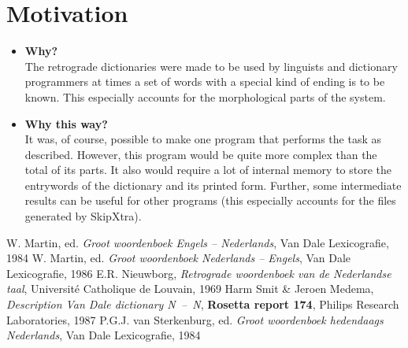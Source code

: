 \section{Motivation}
\begin{itemize}
  \item {\bf Why?}\\
        The retrograde dictionaries were made to be used by linguists and 
        dictionary programmers at times a set of words with a special kind of 
        ending is to be known. This especially accounts for the morphological 
        parts of the system.
  \item {\bf Why this way?}\\
        It was, of course, possible to make one program that performs the task
        as described. However, this program would be quite more complex than 
        the total of its parts. It also would require a lot of internal memory
        to store the entrywords of the dictionary and its printed form. Further,
        some intermediate results can be useful for other programs (this 
        especially accounts for the files generated by SkipXtra).
\end{itemize}

\begin{thebibliography}{MMM99m}
  W. Martin, ed. {\em Groot woordenboek 
  Engels -- Nederlands}, Van Dale Lexicografie, 1984
  W. Martin, ed. {\em Groot woordenboek 
  Nederlands -- Engels}, Van Dale Lexicografie, 1986
  E.R. Nieuwborg, {\em Retrograde woordenboek van de 
  Nederlandse taal}, Universit\'{e} Catholique de Louvain, 1969
  Harm Smit \& Jeroen Medema, {\em Description Van 
  Dale dictionary N~--~N}, {\bf Rosetta report 174}, Philips Research 
  Laboratories, 1987
  P.G.J. van Sterkenburg, ed. {\em Groot woordenboek 
  hedendaags Nederlands}, Van Dale Lexicografie, 1984
\end{thebibliography}
\newpage
\appendix
